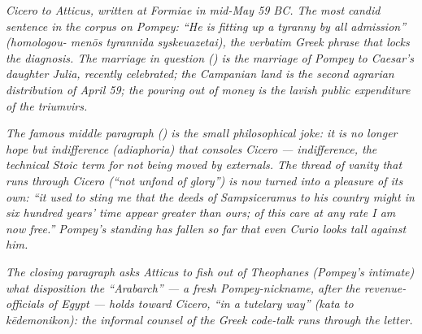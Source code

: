 
\textit{Cicero to Atticus, written at Formiae in mid-May 59
BC. The most candid sentence in the corpus on Pompey: ``He
is fitting up a tyranny by all admission'' \textit{(homologou-
men\=os tyrannida syskeuazetai)}, the verbatim Greek phrase
that locks the diagnosis. The marriage in question
() is the marriage of Pompey to Caesar's
daughter Julia, recently celebrated; the Campanian land is
the second agrarian distribution of April 59; the pouring
out of money is the lavish public expenditure of the
triumvirs.}

\textit{The famous middle paragraph () is the
small philosophical joke: it is no longer hope but
indifference \textit{(adiaphoria)} that consoles Cicero ---
indifference, the technical Stoic term for not being moved
by externals. The thread of vanity that runs through
Cicero (``not unfond of glory'') is now turned into a
pleasure of its own: ``it used to sting me that the deeds
of Sampsiceramus to his country might in six hundred years'
time appear greater than ours; of this care at any rate I
am now free.'' Pompey's standing has fallen so far that
even Curio looks tall against him.}

\textit{The closing paragraph asks Atticus to fish out of
Theophanes (Pompey's intimate) what disposition the
``Arabarch'' --- a fresh Pompey-nickname, after the
revenue-officials of Egypt --- holds toward Cicero, ``in a
tutelary way'' \textit{(kata to k\=edemonikon)}: the
informal counsel of the Greek code-talk runs through the
letter.}
